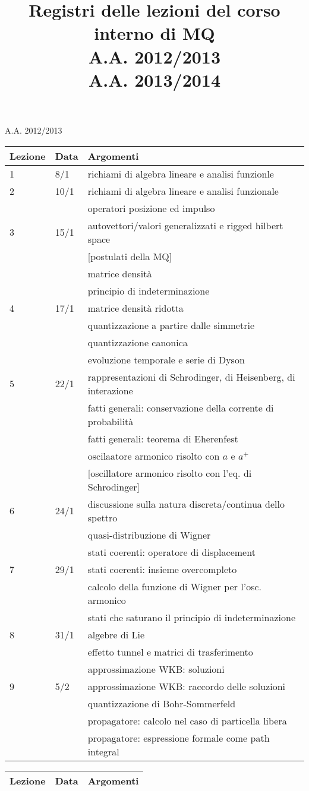 \documentclass[a4paper, 12pt]{article}
\newcommand{\nl}{\\ & & }
\newcommand{\nr}{\\ \midrule}
\begin{document}
\title{
    \textbf{Registri delle lezioni del corso interno di MQ} \\[0.5 cm]
    A.A. 2012/2013 \\[0.2 cm] 
    A.A. 2013/2014}
\date{}

\maketitle

\begin{section}{A.A. 2012/2013}
\begin{tabular}{lll}
\toprule
Lezione & Data & Argomenti\nr

1 & 8/1 & richiami di algebra lineare e analisi funzionle\nr
 
2 & 10/1 & richiami di algebra lineare e analisi funzionale \nl operatori posizione ed impulso\nr

3 & 15/1 & autovettori/valori generalizzati e rigged hilbert space \nl [postulati della MQ] \nl matrice densità \nl principio di indeterminazione\nr

4 & 17/1 & matrice densità ridotta \nl quantizzazione a partire dalle simmetrie \nl quantizzazione canonica \nl evoluzione temporale e serie di Dyson\nr

5 & 22/1 & rappresentazioni di Schrodinger, di Heisenberg, di interazione \nl fatti generali: conservazione della corrente di probabilità \nl fatti generali: teorema di Eherenfest \nl oscilaatore armonico risolto con $a$ e $a^+$ \nl [oscillatore armonico risolto con l'eq. di Schrodinger] \nr

6 & 24/1 & discussione sulla natura discreta/continua dello spettro\nl quasi-distribuzione di Wigner \nl stati coerenti: operatore di displacement \nr

7 & 29/1 & stati coerenti: insieme overcompleto \nl calcolo della funzione di Wigner per l'osc. armonico \nl stati che saturano il principio di indeterminazione \nr

8 & 31/1 & algebre di Lie \nl effetto tunnel e matrici di trasferimento \nl approssimazione WKB: soluzioni \nr

9 & 5/2 & approssimazione WKB: raccordo delle soluzioni \nl quantizzazione di Bohr-Sommerfeld \nl propagatore: calcolo nel caso di particella libera \nl propagatore: espressione formale come path integral \nr

\end{tabular}

\begin{tabular}{lll}
Lezione & Data & Argomenti\nr


\end{tabular}
\end{section}
\end{document}
